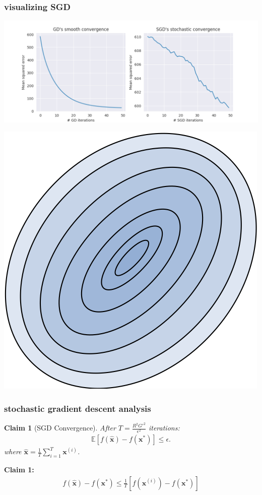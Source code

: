 \documentclass[compress]{beamer}
\newcommand{\bv}[1]{\mathbf{#1}}
\newcommand{\E}{\mathbb{E}}
\newtheorem{claim}[theorem]{Claim}
\begin{document}
\begin{frame}[t]
\frametitle{visualizing SGD}
\begin{center}
	\includegraphics[height=.35\textheight]{gd_convergence.png}
	
	\includegraphics[height=.5\textheight]{gd_paths_raw.png}
\end{center}	
\end{frame}

\begin{frame}[t]
	\frametitle{stochastic gradient descent analysis}
	\begin{claim}[SGD Convergence]
		After $T = \frac{R^2G'^2}{\epsilon^2}$ iterations:
		\begin{align*}
			\E\left[f(\hat{\bv{x}}) - f(\bv{x}^*)\right] \leq \epsilon.
		\end{align*}
	where $\hat{\bv{x}} = \frac{1}{T}\sum_{i=1}^T \bv{x}^{(i)}$.
	\end{claim}
\textbf{Claim 1:} 
\begin{align*}
	f(\hat{\bv{x}}) - f(\bv{x}^*) \leq \frac{1}{T}\left[f(\bv{x}^{(i)}) -f(\bv{x}^*)\right]
\end{align*}
\end{frame}
\end{document}
